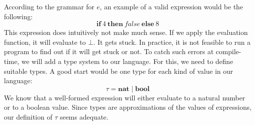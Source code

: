 \documentclass[10pt,a4paper]{exam}
\begin{document}
\begin{questions}
According to the grammar for $e$, an example of a valid expression would be the following:
\begin{displaymath}
\mathbf{if}~4~\mathbf{then}~\mathit{false}~\mathbf{else}~8
\end{displaymath}
This expression does intuitively not make much sense. If we apply the evaluation function, it will evaluate to $\bot$. It gets stuck. In practice, it is not feasible to run a program to find out if it will get stuck or not. To catch such errors at compile-time, we will add a type system to our language. For this, we need to define suitable types. A good start would be one type for each kind of value in our language: 
\begin{displaymath}
\tau = \mathbf{nat} \mid \mathbf{bool}
\end{displaymath}
We know that a well-formed expression will either evaluate to a natural number or to a boolean value. Since types are approximations of the values of expressions, our definition of $\tau$ seems adequate.



\newcommand{\metavar}[1]{{\color{campurple}#1}}
\end{questions}
\end{document}
